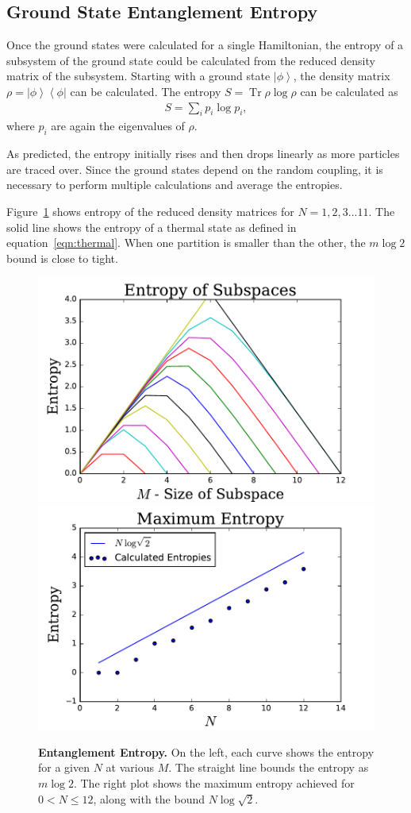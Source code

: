 \documentclass[12pt]{article} %
\newcommand{\ket}[1]{\left|#1\right\rangle}
\newcommand{\bra}[1]{\left\langle#1\right|}
\DeclareMathOperator{\Tr}{Tr}
\begin{document}
\subsection{Ground State Entanglement Entropy}\emph{} \label{sub:num_ent}

Once the ground states were calculated for a single Hamiltonian, the entropy of a subsystem of the ground state could be calculated from the reduced density matrix of the subsystem. Starting with a ground state $\ket{\phi}$, the density matrix $\rho = \ket{\phi}\bra{\phi}$ can be calculated. The entropy $S = \Tr\rho\log\rho$ can be calculated as 
\begin{align}
S = \sum _ip_i\log p_i,
\end{align}
where $p_i$ are again the eigenvalues of $\rho$. 

As predicted, the entropy initially rises and then drops linearly as more particles are traced over. Since the ground states depend on the random coupling, it is necessary to perform multiple calculations and average the entropies. 

Figure~\ref{fig:allentropy} shows entropy of the reduced density matrices for $N = 1,2,3...11$. The solid line shows the entropy of a thermal state as defined in equation~\ref{eqn:thermal}. When one partition is smaller than the other, the $m\log2$ bound is close to tight. 

\begin{figure}
	\centering
	\includegraphics[width=.49\textwidth]{allentropy}
	\includegraphics[width= .49\textwidth]{maxentropy}
	\caption{\textbf{Entanglement Entropy.} On the left, each curve shows the entropy for a given $N$ at various $M$. The straight line bounds the entropy as $m\log2$. The right plot shows the maximum entropy achieved for $0<N\le12$, along with the bound $N\log\sqrt{2}$.}
	\label{fig:allentropy}
\end{figure}
\end{document}
